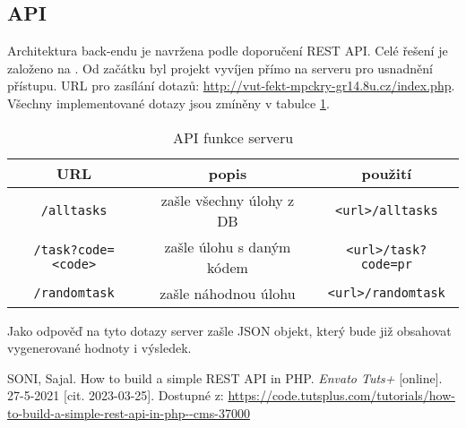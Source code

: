 \documentclass[titlepage]{article}
\begin{document}
 \subsection{API}
Architektura back-endu je navržena podle doporučení REST API. Celé řešení je založeno na \cite{restapi}. Od začátku byl projekt vyvíjen přímo na serveru pro usnadnění přístupu. URL pro zasílání dotazů: \url{http://vut-fekt-mpckry-gr14.8u.cz/index.php}. Všechny implementované dotazy jsou zmíněny v tabulce \ref{tab:api}.
\begin{table}[h!]
    \centering
    \caption{API funkce serveru} 
    \label{tab:api}
    \vspace{.5em}
    \begin{tabular}{|c|c|c|}
        \hline
        \textbf{URL} & \textbf{popis} & \textbf{použití} \\
        \hline \hline
        \texttt{/alltasks} & zašle všechny úlohy z DB & \texttt{<url>/alltasks} \\
        \hline
        \texttt{/task?code=<code>} &zašle úlohu s daným kódem & \texttt{<url>/task?code=pr} \\
        \hline
        \texttt{/randomtask} & zašle náhodnou úlohu & \texttt{<url>/randomtask}\\
        \hline
    \end{tabular}
\end{table}

Jako odpověď na tyto dotazy server zašle JSON objekt, který bude již obsahovat vygenerované hodnoty i výsledek. 


\begin{thebibliography}{9}
    SONI, Sajal. How to build a simple REST API in PHP. \emph{En\-va\-to Tuts+} [on\-li\-ne]. 27-5-2021 [cit. 2023-03-25]. Dostupné z: \url{https://code.tutsplus.com/tutorials/how-to-build-a-simple-rest-api-in-php--cms-37000}
\end{thebibliography}

    
\end{document}
